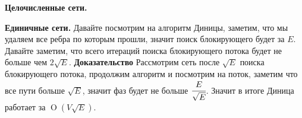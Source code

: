   \newpage
  \begin{center}
    \textbf{Целочисленные сети.}
  \end{center}

  \textbf{ Единичные сети.} Давайте посмотрим на алгоритм Диницы, заметим, что мы удаляем все ребра по которым прошли, значит поиск блокирующего будет за $E$. Давайте заметим, что всего итераций поиска блокирующего потока будет не больше чем $2 \sqrt{E}$. \textbf{ Доказательство } Рассмотрим сеть после $\sqrt{E}$ поиска блокирующего потока, продолжим алгоритм и посмотрим на поток, заметим что все пути больше $\sqrt{E}$, значит фаз будет не больше $\cfrac{E}{\sqrt{E}}$. Значит в итоге Диница работает за $\operatorname{O} (V \sqrt{E})$.
